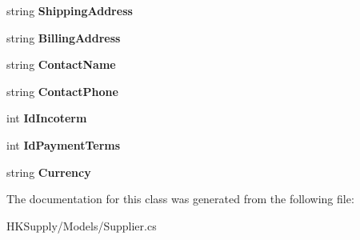 \begin{DoxyCompactItemize}
\item 
\mbox{\label{class_h_k_supply_1_1_models_1_1_supplier_ab765a1c38ddac7aff4cd9c46b529b51b}} 
string {\bfseries Shipping\+Address}
\item 
\mbox{\label{class_h_k_supply_1_1_models_1_1_supplier_aa93f31a4cb853acf2d9e7f1d784849ad}} 
string {\bfseries Billing\+Address}
\item 
\mbox{\label{class_h_k_supply_1_1_models_1_1_supplier_ad20341adc619c07e05537cdb8db059e5}} 
string {\bfseries Contact\+Name}
\item 
\mbox{\label{class_h_k_supply_1_1_models_1_1_supplier_a9deb74cae3643174e463fce1aa619f8f}} 
string {\bfseries Contact\+Phone}
\item 
\mbox{\label{class_h_k_supply_1_1_models_1_1_supplier_a4219a14258ebdd2c9c3a01fab8f26b50}} 
int {\bfseries Id\+Incoterm}
\item 
\mbox{\label{class_h_k_supply_1_1_models_1_1_supplier_ad34530d0191bafb6dc54f9a10cefd3ed}} 
int {\bfseries Id\+Payment\+Terms}
\item 
\mbox{\label{class_h_k_supply_1_1_models_1_1_supplier_a71458cebf8965dd25a681cbfdaa26456}} 
string {\bfseries Currency}
\end{DoxyCompactItemize}


The documentation for this class was generated from the following file\+:\begin{DoxyCompactItemize}
\item 
H\+K\+Supply/\+Models/Supplier.\+cs\end{DoxyCompactItemize}
